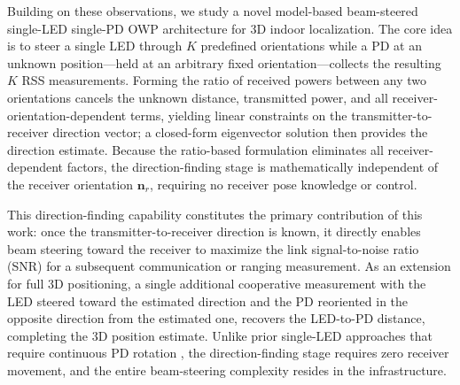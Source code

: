 \documentclass[journal]{IEEEtran}
\newcommand{\added}[1]{{\color{blue}#1}}
\begin{document}
\added{Building on these observations, we study a novel model-based beam-steered single-LED single-PD OWP architecture for 3D indoor localization. The core idea is to steer a single LED through $K$ predefined orientations while a PD at an unknown position---held at an arbitrary fixed orientation---collects the resulting $K$ RSS measurements. Forming the ratio of received powers between any two orientations cancels the unknown distance, transmitted power, and all receiver-orientation-dependent terms, yielding linear constraints on the transmitter-to-receiver direction vector; a closed-form eigenvector solution then provides the direction estimate. Because the ratio-based formulation eliminates all receiver-dependent factors, the direction-finding stage is mathematically independent of the receiver orientation $\mathbf{n}_r$, requiring no receiver pose knowledge or control.}

\added{This direction-finding capability constitutes the primary contribution of this work: once the transmitter-to-receiver direction is known, it directly enables beam steering toward the receiver to maximize the link signal-to-noise ratio (SNR) for a subsequent communication or ranging measurement. As an extension for full 3D positioning, a single additional cooperative measurement with the LED steered toward the estimated direction and the PD reoriented in the opposite direction from the estimated one, recovers the LED-to-PD distance, completing the 3D position estimate. Unlike prior single-LED approaches that require continuous PD rotation \cite{Liu2022, Wang2024, Shi2025}, the direction-finding stage requires zero receiver movement, and the entire beam-steering complexity resides in the infrastructure.}
\end{document}
